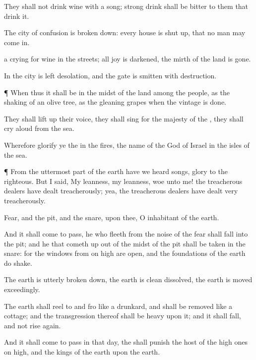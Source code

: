 {They shall not
drink
wine with a
song; strong
drink shall be
bitter to them that
drink it.

The
city of
confusion is broken
down: every
house is shut
up, that no man may come
in.

 a
crying for
wine in the
streets; all
joy is
darkened, the
mirth of the
land is
gone.

In the
city is
left
desolation, and the
gate is
smitten with
destruction.


\par }{\PP {}¶ When thus it shall be in the
midst of the
land
among the
people,
{} as the
shaking of an olive
tree,
{} as the gleaning
grapes when the
vintage is
done.

They shall lift
up their
voice, they shall
sing for the
majesty of the
{}, they shall cry
aloud from the
sea.

Wherefore
glorify ye the
{} in the
fires,
{} the
name of the
{}
God of
Israel in the
isles of the
sea.


\par }{\PP {}¶ From the uttermost
part of the
earth have we
heard
songs,
{}
glory to the
righteous. But I
said, My
leanness, my
leanness,
woe unto me! the treacherous
dealers have dealt
treacherously; yea, the treacherous
dealers have dealt
very
treacherously.

Fear, and the
pit, and the
snare,
{} upon thee, O
inhabitant of the
earth.

And it shall come to pass,
{} he who
fleeth from the
noise of the
fear shall
fall into the
pit; and he that cometh
up out of the
midst of the
pit shall be
taken in the
snare: for the
windows from on
high are
open, and the
foundations of the
earth do
shake.

The
earth is
utterly broken
down, the
earth is
clean
dissolved, the
earth is
moved
exceedingly.

The
earth shall
reel to and
fro like a
drunkard, and shall be
removed like a
cottage; and the
transgression thereof shall be
heavy upon it; and it shall
fall, and not
rise
again.

And it shall come to pass in that
day,
{} the
{} shall
punish the
host of the high
ones
{} on
high, and the
kings of the
earth upon the
earth.

}
